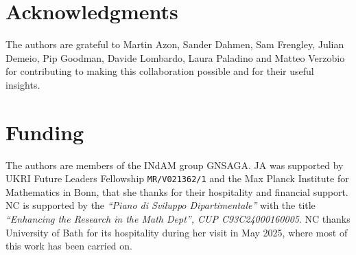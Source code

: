 \documentclass[a4paper,11pt]{amsart}
\theoremstyle{definition}
\begin{document}
\section*{Acknowledgments}
The authors are grateful to Martin Azon, Sander Dahmen, Sam Frengley, Julian Demeio, Pip Goodman, Davide Lombardo, Laura Paladino and Matteo Verzobio for contributing to making this collaboration possible and for their useful insights.
\section*{Funding}
The authors are members of the INdAM group GNSAGA. JA was supported by UKRI Future Leaders Fellowship \texttt{MR/V021362/1} and the Max Planck Institute for Mathematics in Bonn, that she thanks for their hospitality and financial support. NC is supported by the \emph{``Piano di Sviluppo Dipartimentale''} with the title \emph{``Enhancing the Research in the Math Dept'', CUP C93C24000160005}. NC thanks University of Bath for its hospitality during her visit in May 2025, where most of this work has been carried on. 


\end{document}
